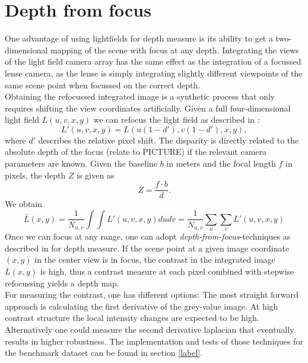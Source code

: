 \documentclass  [
  paper    = a4,
  BCOR     = 10mm,
  twoside,
  fontsize = 12pt,
  fleqn,
  toc      = bibnumbered,
  toc      = listofnumbered,
  numbers  = noendperiod,
  headings = normal,
  listof   = leveldown,
  version  = 3.03
]                                       {scrreprt}
\begin{document}
\section{Depth from focus}
\label{sec:theo depth}
One advantage of using lightfields for depth measure is its ability to get a two-dimensional mapping of the scene with focus at any depth. Integrating the views of the light field camera array has the same effect as the integration of a focussed lense camera, as the lense is simply integrating slightly different viewpoints of the same scene point when focussed on the correct depth. \\
 Obtaining the refocussed integrated image is a synthetic process that only requires shifting the view coordinates artificially. Given a full four-dimensional light field $L(u, v, x, y)$ we can refocus the light field as described in \cite{ng2005light}:
 \begin{equation}\label{eq:refocus}
L'(u, v, x, y) = L(u(1-d'), v(1-d'), x, y),
\end{equation}
where $d'$ describes the relative pixel shift. The disparity is directly related to the absolute depth of the focus (relate to PICTURE) if the relevant camera parameters are  known. Given the baseline $b$ in meters and the focal length $f$ in pixels, the depth $Z$ is given as \begin{equation}\label{key}
Z = \frac{f\cdot b}{d}.
\end{equation} 
We obtain
\begin{equation}\label{key}
\bar{L}(x,y) = \frac{1}{N_{u,v}}\int\int L'(u, v, x, y) du  dv =\frac{1}{N_{u,v}}\sum_{u}\sum_{v}  L'(u, v, x, y)
\end{equation}
Once we can focus at any range, one can adopt \textit{depth-from-focus}-techniques as described in \cite{watanabe1998rational} for depth measure. If the scene point at a given image coordinate $(x, y)$ in the center view is in focus, the contrast in the integrated image $\bar{L}(x,y)$ is high, thus a contrast measure at each pixel combined with stepwise refocussing yields a depth map. \\
For measuring the contrast, one has different options: The most straight forward approach is calculating the first derivative of the grey-value image. At high contrast structure the local intensity changes are expected to be high. Alternatively one could measure the second derivative laplacian that eventually results in higher robustness. The implementation and tests of those techniques for the benchmark dataset can be found in section \ref{label}.\\
\end{document}
